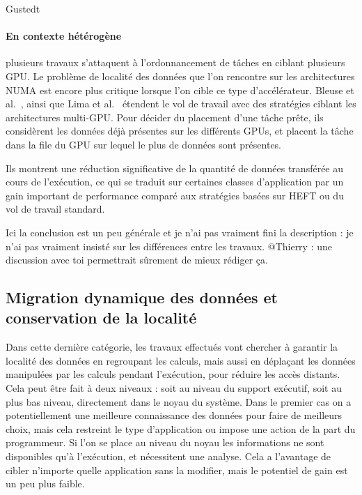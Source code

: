 \begin{todo}
  Gustedt~\cite{Gustedt2017}
\end{todo}


\paragraph{En contexte hétérogène} plusieurs travaux s'attaquent à l'ordonnancement de tâches en ciblant plusieurs GPU.
Le problème de localité des données que l'on rencontre sur les architectures NUMA est encore plus critique lorsque l'on cible ce type d'accélérateur.
Bleuse et al.~\cite{Bleuse2014}, ainsi que Lima et al.~\cite{Lima2015} étendent le vol de travail avec des stratégies ciblant les architectures multi-GPU.
Pour décider du placement d'une tâche prête, ils considèrent les données déjà présentes sur les différents GPUs, et placent la tâche dans la file du GPU sur lequel le plus de données sont présentes.

Ils montrent une réduction significative de la quantité de données transférée au cours de l'exécution, ce qui se traduit sur certaines classes d'application par un gain important de performance comparé aux stratégies basées sur HEFT ou du vol de travail standard.

\begin{todo}
  Ici la conclusion est un peu générale et je n'ai pas vraiment fini la description : je n'ai pas vraiment insisté sur les différences entre les travaux.
  @Thierry : une discussion avec toi permettrait sûrement de mieux rédiger ça.
\end{todo}


\subsection{Migration dynamique des données et conservation de la localité}\label{sec:rw:numa:thread-data}

Dans cette dernière catégorie, les travaux effectués vont chercher à garantir la localité des données en regroupant les calculs, mais aussi en déplaçant les données manipulées par les calculs pendant l'exécution, pour réduire les accès distants.
Cela peut être fait à deux niveaux : soit au niveau du support exécutif, soit au plus bas niveau, directement dans le noyau du système.
Dans le premier cas on a potentiellement une meilleure connaissance des données pour faire de meilleurs choix, mais cela restreint le type d'application ou impose une action de la part du programmeur.
Si l'on se place au niveau du noyau les informations ne sont disponibles qu'à l'exécution, et nécessitent une analyse. Cela a l'avantage de cibler n'importe quelle application sans la modifier, mais le potentiel de gain est un peu plus faible.

